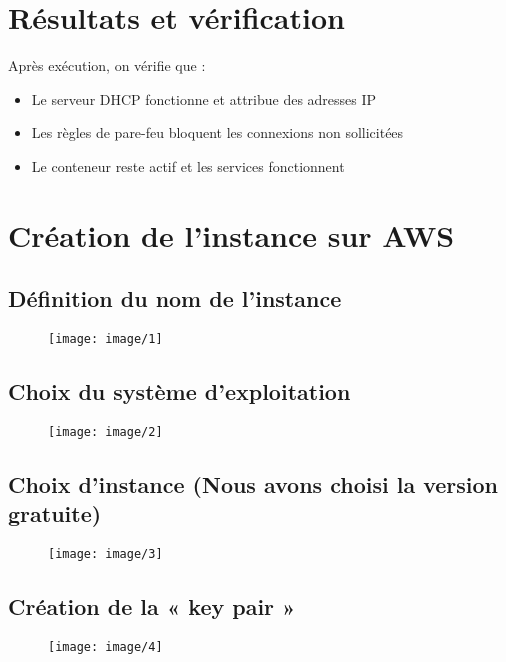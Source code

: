 	\section{Résultats et vérification}
	Après exécution, on vérifie que :
	\begin{itemize}
		\item Le serveur DHCP fonctionne et attribue des adresses IP
		\item Les règles de pare-feu bloquent les connexions non sollicitées
		\item Le conteneur reste actif et les services fonctionnent
	\end{itemize}

 \section{Création de l’instance sur AWS}
 \subsection{Définition du nom de l’instance}
\begin{figure}[h!]
	\centering
	\texttt{[image: image/1]}
	\label{fig:1}
\end{figure}

\subsection{Choix du système d’exploitation}
	\begin{figure}[h!]
		\centering
		\texttt{[image: image/2]}
		\label{fig:2}
	\end{figure}

\subsection{Choix d’instance (Nous avons choisi la version gratuite)}
\begin{figure}[h!]
	\centering
	\texttt{[image: image/3]}
	\label{fig:3}
\end{figure}
\newpage
\subsection{Création de la « key pair »}
\begin{figure}[h!]
	\centering
	\texttt{[image: image/4]}
	\label{fig:4}
\end{figure}

